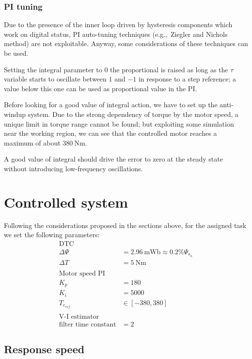 \subsubsection{PI tuning}

Due to the presence of the inner loop driven by hysteresis components which work on digital status, PI auto-tuning techniques (e.g.,\ Ziegler and Nichols method) are not exploitable.
Anyway, some considerations of these techniques can be used.

Setting the integral parameter to $0$ the proportional is raised as long as the $\tau$ variable starts to oscillate between $1$ and $-1$ in response to a step reference; a value below this one can be used as proportional value in the PI.

Before looking for a good value of integral action, we have to set up the anti-windup system.
Due to the strong dependency of torque by the motor speed, a unique limit in torque range cannot be found; but exploiting some simulation near the working region, we can see that the controlled motor reaches a maximum of about $\qty{380}{\N\m}$.

A good value of integral should drive the error to zero at the steady state without introducing low-frequency oscillations.

\section{Controlled system}

Following the considerations proposed in the sections above, for the assigned task we set the following parameters:
\begin{align*}
	\text{DTC} & \\
	\Delta \Psi &= \qty{2.96}{\milli\weber} \approx 0.2\%\Psi_{s_n} \\
	\Delta T &= \qty{5}{\N\m} \\
	& \\
	\text{Motor speed PI} & \\
	K_p &= 180 \\
	K_i &= 5000 \\
	T_{e_{ref}} &\in [-380,380] \\
	& \\
	\text{V-I estimator} & \\
	\text{filter time constant} &= 2
\end{align*}

\subsection{Response speed}

